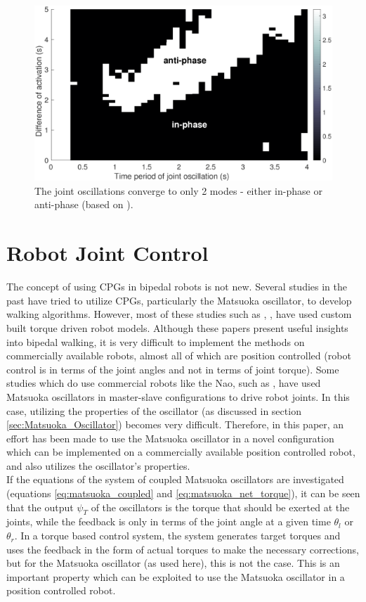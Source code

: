 \documentclass[12pt,twoside]{article}
\theoremstyle{plain}
\theoremstyle{definition}
\theoremstyle{remark}
\newcommand{\forceindent}{\leavevmode{\parindent=2em\indent}}
\begin{document}
\begin{figure}[htbp]
\centering
\includegraphics[scale=0.3]{figures/5-1-stable-attractors.eps}
\caption{The joint oscillations converge to only 2 modes - either in-phase or anti-phase (based on \cite{Ronsse2009}).}
\label{fig:stable-attractors}
\end{figure}

\section{Robot Joint Control}
\label{sec:Robot_Joint_Control}
The concept of using CPGs in bipedal robots is not new. Several studies in the past have tried to utilize CPGs, particularly the Matsuoka oscillator, to develop walking algorithms. However, most of these studies such as \cite{Taga1991}, \cite{nakanishi2004learning}, \cite{Ishiguro2003} have used custom built torque driven robot models. Although these papers present useful insights into bipedal walking, it is very difficult to implement the methods on commercially available robots, almost all of which are position controlled (robot control is in terms of the joint angles and not in terms of joint torque). Some studies which do use commercial robots like the Nao, such as \cite{cristiano2014locomotion}, have used Matsuoka oscillators in master-slave configurations to drive robot joints. In this case, utilizing the properties of the oscillator (as discussed in section \ref{sec:Matsuoka_Oscillator}) becomes very difficult. Therefore, in this paper, an effort has been made to use the Matsuoka oscillator in a novel configuration which can be implemented on a commercially available position controlled robot, and also utilizes the oscillator's properties.\\
\forceindent If the equations of the system of coupled Matsuoka oscillators are investigated (equations \ref{eq:matsuoka_coupled} and \ref{eq:matsuoka_net_torque}), it can be seen that the output $\psi_T$ of the oscillators is the torque that should be exerted at the joints, while the feedback is only in terms of the joint angle at a given time $\theta_l$ or $\theta_r$. In a torque based control system, the system generates target torques and uses the feedback in the form of actual torques to make the necessary corrections, but for the Matsuoka oscillator (as used here), this is not the case. This is an important property which can be exploited to use the Matsuoka oscillator in a position controlled robot.
\end{document}
